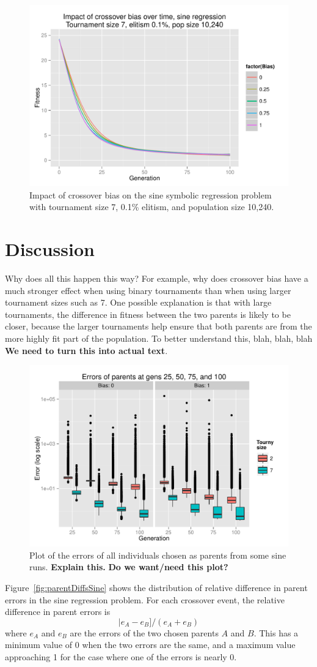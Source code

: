 \documentclass{sig-alternate}
\begin{document}
\begin{figure}
\centering
\includegraphics[width=0.45 \textwidth]{Plots/Sine_XO_fitness_vs_gen_t2_e01_p10K.pdf}
\caption{Impact of crossover bias on the sine symbolic regression problem with tournament size 7, 0.1\% elitism, and 
population size 10,240.}
\label{fig:sineBiasFitnessVsGenT2E01P10K}
\end{figure}

\section{Discussion} \label{sec:Discussion}

Why does all this happen this way? For example, why does crossover bias have a much stronger effect when using 
binary tournaments than when using larger tournament sizes such as 7. One possible explanation is that with large 
tournaments, the difference in fitness between the two parents is likely to be closer, because the larger tournaments 
help ensure that both parents are from the more highly fit part of the population. To better understand this, blah, blah, 
blah \textbf{We need to turn this into actual text}.

\begin{figure}
\centering
\includegraphics[width=0.45 \textwidth]{Plots/Parent_errors_sine.pdf}
\caption{Plot of the errors of all individuals chosen as parents from some sine runs. \textbf{Explain this.} \textbf{Do we want/need this plot?}}
\label{fig:parentErrorsSine}
\end{figure}

Figure~\ref{fig:parentDiffsSine} shows the distribution of relative difference in parent errors in the sine regression 
problem. For each crossover event, the relative difference in parent errors is
\[
	|e_A - e_B] / (e_A + e_B)
\]
where $e_A$ and $e_B$ are the errors of the two chosen parents $A$ and $B$. This has a minimum value of 0 when 
the two errors are the same, and a maximum value approaching 1 for the case where one of the errors is nearly 0.
\end{document}

